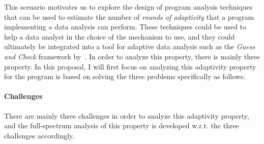 This scenario motivates us to explore the design of program analysis techniques that can be used to estimate the number of \emph{rounds of adaptivity} that a program implementing a data analysis can perform. These techniques could be used to help a data analyst in the choice of the mechanism to use,
and they
could ultimately be integrated into a tool for adaptive data analysis such as the \emph{Guess and Check} framework by~\cite{RogersRSSTW20}. 
%
In order to analyze this property, there is mainly three property. 
In this proposal, I will first focus on analyzing 
this adaptivity property for the program is based on solving the three problems specifically as follows.

\paragraph{Challenges}
\label{sec:intro-challenge}


There are mainly three challenges in order to analyze this adaptivity property, 
and the full-spectrum analysis of this property is 
developed w.r.t. the three challenges accordingly.


